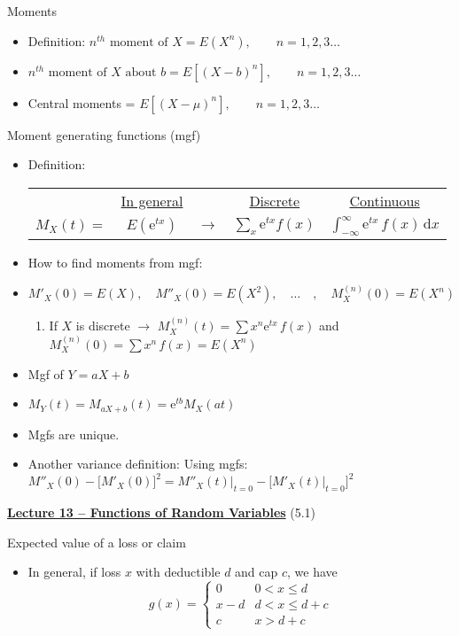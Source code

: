 \documentclass{article}
\newcommand{\bu}[1]{\textbf{\ul{#1}}}				%
\newcommand{\integral}[4]{\int_{#1}^{#2} #3 \,\mathrm{d} #4}		%
\newcommand{\e}{\mathrm{e}}		%
\begin{document}
Moments
\begin{itemize}
    \item Definition: $n^{th} \text{ moment of } X = E(X^n), \quad\quad n = 1, 2, 3\ldots$
    \item $n^{th} \text{ moment of } X \text{ about } b = E[(X - b)^n], \quad\quad n = 1, 2, 3\ldots$
    \item Central moments = $E[(X - \mu)^n], \quad\quad n = 1, 2, 3\ldots$
\end{itemize}\bigskip

Moment generating functions (mgf)
\begin{itemize}
    \item Definition:\bigskip\\
    \begin{tabular}{c c c c c}
        & \ul{In general} & & \ul{Discrete} & \ul{Continuous}\\
        $M_X(t) = $ & $E(\e^{tx})$ & $\rightarrow$ & $\displaystyle \sum_x \e^{tx} f(x) $ & $\integral{-\infty}{\infty}{\e^{tx} \, f(x)}{x}$\\
    \end{tabular}\newpage
    \item How to find moments from mgf:
    \item[] $M'_X(0) = E(X), \quad M''_X(0) = E(X^2), \quad \ldots \quad, \quad M_X^{(n)}(0) = E(X^n)$
    \begin{enumerate}[*]
        \item If $X$ is discrete $\rightarrow$ $M_X^{(n)}(t) = \sum x^n \e^{tx} \, f(x)$ and $M_X^{(n)}(0) = \sum x^n \, f(x) = E(X^n)$
    \end{enumerate}
    \item Mgf of $Y = aX + b$
    \item[] $M_Y(t) = M_{aX + b}(t) = \e^{tb} M_X(at)$
    \item Mgfs are unique.
    \item Another variance definition: Using mgfs: $M''_X(0) - \big[M'_X(0)\big]^2 = M''_X(t)\big\rvert_{t = 0} - \big[M'_X(t)\big\rvert_{t = 0}\big]^2$
\end{itemize}\bigskip

\vspace{60pt}

{\large \bu{Lecture 13 -- Functions of Random Variables}} (5.1)\bigskip

Expected value of a loss or claim
\begin{itemize}
    \item In general, if loss $x$ with deductible $d$ and cap $c$, we have
    \[
    g(x) =
    \left\{
    \begin{array}{ll}
        0 & 0 < x \le d\\
        x - d & d < x \le d + c\\
        c & x > d + c
    \end{array}
    \right.
    \]
\end{itemize}\bigskip
\end{document}
